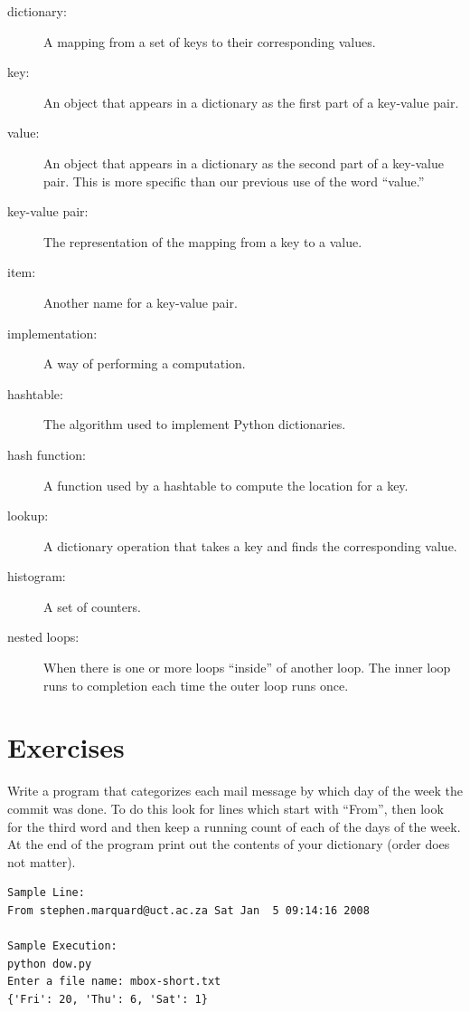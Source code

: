 \documentclass[10pt]{book}
\begin{document}
\begin{description}

\item[dictionary:] A mapping from a set of keys to their
corresponding values.

\item[key:] An object that appears in a dictionary as the
first part of a key-value pair.

\item[value:] An object that appears in a dictionary as the
second part of a key-value pair.  This is more specific than
our previous use of the word ``value.''

\item[key-value pair:] The representation of the mapping from
a key to a value.

\item[item:] Another name for a key-value pair.

\item[implementation:] A way of performing a computation.

\item[hashtable:] The algorithm used to implement Python
dictionaries.

\item[hash function:] A function used by a hashtable to compute the
location for a key.

\item[lookup:] A dictionary operation that takes a key and finds
the corresponding value.

\item[histogram:] A set of counters.

\item[nested loops:] When there is one or more loops ``inside'' of 
another loop.  The inner loop runs to completion each time the outer
loop runs once.

\end{description}

\section{Exercises}

\begin{ex}
Write a program that categorizes each mail message by which 
day of the week the commit was done. To do this look for 
lines which start with ``From'', then look for the 
third word and then keep a running count of each of the 
days of the week. At the end of the program print out the 
contents of your dictionary (order does not matter).

\beforeverb
\begin{verbatim}
Sample Line:
From stephen.marquard@uct.ac.za Sat Jan  5 09:14:16 2008

Sample Execution:
python dow.py
Enter a file name: mbox-short.txt
{'Fri': 20, 'Thu': 6, 'Sat': 1}
\end{verbatim}
\afterverb
\end{ex}
\end{document}
